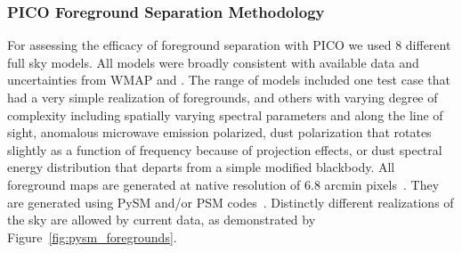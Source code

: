 \documentclass[PICOReport.tex]{subfiles}
\begin{document}


\subsubsection{PICO Foreground Separation Methodology}

For assessing the efficacy of foreground separation with PICO we used 8 different full sky models. All models were broadly consistent with available data and uncertainties from WMAP and \planck . The range of models included one test case that had a very simple realization of foregrounds, and others with varying degree of complexity including spatially varying spectral parameters and along the line of sight, anomalous microwave emission  polarized, dust polarization that rotates slightly as a function of frequency because of projection effects, or dust spectral energy distribution that departs from a simple modified blackbody. All foreground maps are generated at native resolution of 6.8 arcmin pixels~\citep{gorski/etal:2005}. They are generated using PySM and/or PSM codes~\citep{thorne2018_pysm}.   Distinctly different realizations of the sky are allowed by current data, as demonstrated by Figure~\ref{fig:pysm_foregrounds}. 
\end{document}
